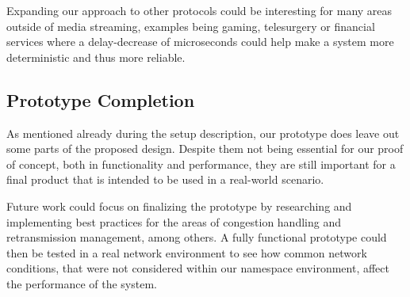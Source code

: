 Expanding our approach to other protocols could be interesting for 
many areas outside of media streaming, examples being gaming, 
telesurgery or financial services where a delay-decrease of 
microseconds could help make a system more deterministic and 
thus more reliable.

\subsection{Prototype Completion}\label{sec:prototype_completion}
As mentioned already during the setup description, our prototype 
does leave out some parts of the proposed design.
Despite them not being essential for our proof of concept,
both in functionality and performance, they are still important
for a final product that is intended to be used in a real-world
scenario.

Future work could focus on finalizing the prototype by researching 
and implementing best practices for the areas of congestion handling
and retransmission management, among others.
A fully functional prototype could then be tested in a real network
environment to see how common network conditions, that were not considered
within our namespace environment, affect the performance of the system.
